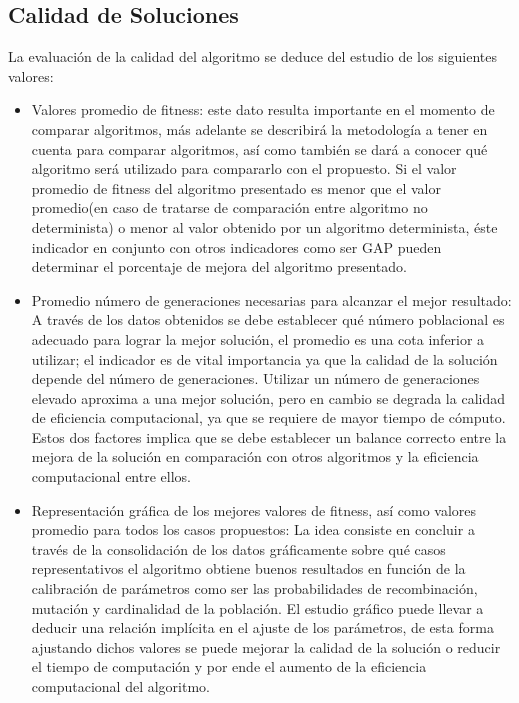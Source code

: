 \documentclass[journal]{IEEEtran}
\begin{document}
\subsection{Calidad de Soluciones}
La evaluación de la calidad del algoritmo se deduce del estudio de los siguientes valores:
\begin{itemize}
  \item Valores promedio de fitness: este dato resulta importante en el momento de comparar algoritmos, más adelante se describirá la metodología a tener en cuenta para comparar algoritmos, así como también se dará a conocer qué algoritmo será utilizado para compararlo con el propuesto. Si el valor promedio de fitness del algoritmo presentado es menor que el valor promedio(en caso de tratarse de comparación entre algoritmo no determinista) o menor al valor obtenido por un algoritmo determinista, éste indicador en conjunto con otros indicadores como ser GAP pueden determinar el porcentaje de mejora del algoritmo presentado.
  \item Promedio número de generaciones necesarias para alcanzar el mejor resultado: A través de los datos obtenidos se debe establecer qué número poblacional es adecuado para lograr la mejor solución, el promedio es una cota inferior a utilizar; el indicador es de vital importancia ya que la calidad de la solución depende del número de generaciones. Utilizar un número de generaciones elevado aproxima a una mejor solución, pero en cambio se degrada la calidad de eficiencia computacional, ya que se requiere de mayor tiempo de cómputo. Estos dos factores implica que se debe establecer un balance correcto entre la mejora de la solución en comparación con otros algoritmos y la eficiencia computacional entre ellos.
  \item Representación gráfica de los mejores valores de fitness, así como valores promedio para todos los casos propuestos: La idea consiste en concluir a través de la consolidación de los datos gráficamente sobre qué casos representativos el algoritmo obtiene buenos resultados en función de la calibración de parámetros como ser las probabilidades de recombinación, mutación y cardinalidad de la población. El estudio gráfico puede llevar a deducir una relación implícita en el ajuste de los parámetros, de esta forma ajustando dichos valores se puede mejorar la calidad de la solución o reducir el tiempo de computación y por ende el aumento de la eficiencia computacional del algoritmo.
\end{itemize}
\end{document}
